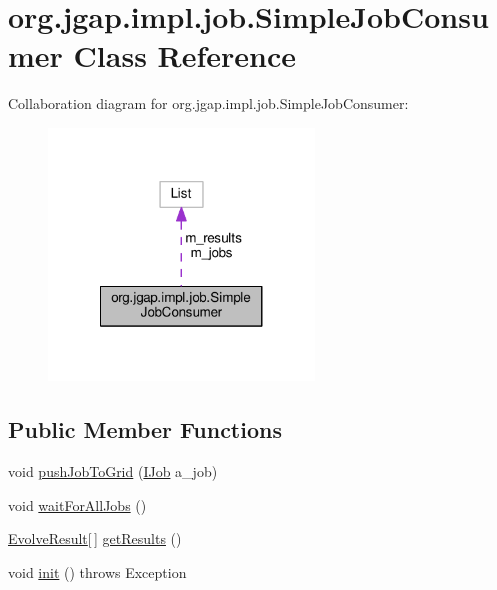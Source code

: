 \hypertarget{classorg_1_1jgap_1_1impl_1_1job_1_1_simple_job_consumer}{\section{org.\-jgap.\-impl.\-job.\-Simple\-Job\-Consumer Class Reference}
\label{classorg_1_1jgap_1_1impl_1_1job_1_1_simple_job_consumer}
}


Collaboration diagram for org.\-jgap.\-impl.\-job.\-Simple\-Job\-Consumer\-:
\nopagebreak
\begin{figure}[H]
\begin{center}
\leavevmode
\includegraphics[width=200pt]{classorg_1_1jgap_1_1impl_1_1job_1_1_simple_job_consumer__coll__graph}
\end{center}
\end{figure}
\subsection*{Public Member Functions}
\begin{DoxyCompactItemize}
\item 
void \hyperlink{classorg_1_1jgap_1_1impl_1_1job_1_1_simple_job_consumer_a3b6c5abc8992d928c3529d2ce62f94a9}{push\-Job\-To\-Grid} (\hyperlink{interfaceorg_1_1jgap_1_1impl_1_1job_1_1_i_job}{I\-Job} a\-\_\-job)
\item 
void \hyperlink{classorg_1_1jgap_1_1impl_1_1job_1_1_simple_job_consumer_a2d4216f5e3957b29d2d5dbd66a56561a}{wait\-For\-All\-Jobs} ()
\item 
\hyperlink{classorg_1_1jgap_1_1impl_1_1job_1_1_evolve_result}{Evolve\-Result}\mbox{[}$\,$\mbox{]} \hyperlink{classorg_1_1jgap_1_1impl_1_1job_1_1_simple_job_consumer_a2dfddb2fdc57aa66770629cf481c4a6a}{get\-Results} ()
\item 
void \hyperlink{classorg_1_1jgap_1_1impl_1_1job_1_1_simple_job_consumer_a2038d48af9ac2f782f7ddc3be05b3a5b}{init} ()  throws Exception 
\end{DoxyCompactItemize}
